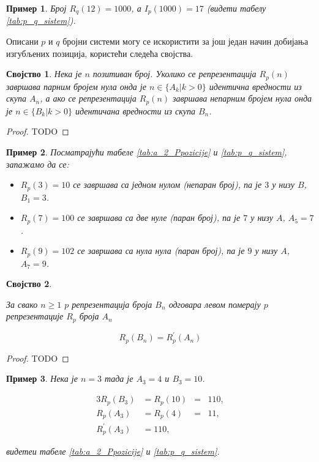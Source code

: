 \documentclass[a4paper]{article}
\newtheorem{example}{Пример}
\newtheorem{property}{Својство}
\begin{document}
\begin{example}
	Број $ R_{q}(12) = 1000 $, а $ I_{p}(1000) = 17 $ (видети табелу \ref{tab:p_q_sistem}).
\end{example}

Описани $ p $ и $ q $ бројни системи могу се искористити за још један начин добијања изгубљених позиција, користећи следећа својства.

\begin{property}
	\label{prop:r_p_nule}
	Нека је $ n $ позитиван број. Уколико се репрезентација $ R_p(n) $ завршава парним бројем нула онда је $ n \in \{A_{k} | k>0\} $ идентична вредности из скупа $ A_{n} $, а ако се репрезентација $ R_p(n) $ завршава непарним бројем нула онда је $ n \in \{B_{k} | k>0\} $ идентичана вредности из скупа $ B_{n} $.
\end{property}

\begin{proof}
	TODO
\end{proof}

\begin{example}
	Посматрајући табеле \ref{tab:a_2_Ppozicije} и \ref{tab:p_q_sistem}, запажамо да се:
	\begin{itemize}
		\item $ R_{p}(3) = 10 $ се завршава са једном нулом (непаран број), па је $ 3 $ у низу $ B $, $ B_{1} = 3 $. 
		\item $ R_{p}(7) = 100 $ се завршава са две нуле (паран број), па је $ 7 $ у низу $ A $, $ A_{5} = 7 $.
		\item $ R_{p}(9) = 102 $ се завршава са нула нула (паран број), па је $ 9 $ у низу $ A $, $ A_{7} = 9 $.
	\end{itemize}
\end{example}

\begin{property}
	\label{prop:levi_pomeraj}

	За свако $ n \geq 1 $ $ p $ репрезентација броја $ B_{n} $ одговара левом померају $ p $ репрезентације $ 
	R_{p} $ броја  $ A_{n} $
	
		\begin{displaymath}
			R_{p} (B_{n}) = R_{p}^{'} (A_{n}) 
		\end{displaymath}

\end{property}

\begin{proof}
	TODO
\end{proof}

\begin{example}
	Нека је $ n = 3 $ тада је $ A_{3} = 4 $ и $ B_{3} = 10 $.
	
	\begin{alignat*}{3}
		R_{p}(B_{3}) &= R_{p}(10)	&=& 110,\\
		R_{p}(A_{3}) &= R_{p}(4)	&=& 11,\\
		R_{p}^{'}(A_{3}) &= 110,
	\end{alignat*}
	
	видетеи табеле \ref{tab:a_2_Ppozicije} и \ref{tab:p_q_sistem}.
\end{example}
\end{document}
